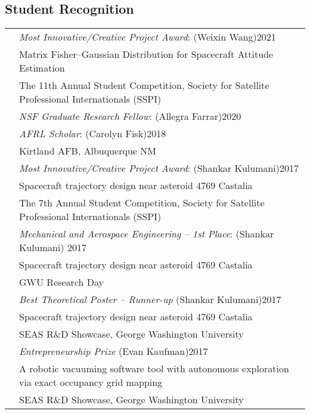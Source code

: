 \documentclass[10pt]{article}
\begin{document}
\subsection*{Student Recognition}
\setlength{\tabcolsep}{0cm}
\begin{tabularx}{\textwidth}{>{\setlength{\hsize}{0.5cm}}X X}%
& \textit{Most Innovative/Creative Project Award}: (Weixin Wang)\hfill 2021\\
& {Matrix Fisher--Gaussian Distribution for Spacecraft Attitude Estimation}\\
& The 11th Annual Student Competition, Society for Satellite Professional Internationals (SSPI)\\[0.2cm]

& \textit{NSF Graduate Research Fellow}: (Allegra Farrar)\hfill 2020\\[0.2cm]

& \textit{AFRL Scholar}: (Carolyn Fisk)\hfill 2018\\
& Kirtland AFB, Albuquerque NM\\[0.2cm]

& \textit{Most Innovative/Creative Project Award}: (Shankar Kulumani)\hfill 2017\\
& {Spacecraft trajectory design near asteroid 4769 Castalia}\\
& The 7th Annual Student Competition, Society for Satellite Professional Internationals (SSPI)\\[0.2cm]

& \textit{Mechanical and Aerospace Engineering -- 1st Place}: (Shankar Kulumani) \hfill 2017\\
& {Spacecraft trajectory design near asteroid 4769 Castalia}\\
& GWU Research Day\\[0.2cm]


& \textit{Best Theoretical Poster -- Runner-up} (Shankar Kulumani)\hfill 2017\\
& Spacecraft trajectory design near asteroid 4769 Castalia\\
& SEAS R\&D Showcase, George Washington University\\[0.2cm]


& \textit{Entrepreneurship Prize} (Evan Kaufman)\hfill 2017\\
& A robotic vacuuming software tool with autonomous exploration via exact occupancy grid mapping\\
& SEAS R\&D Showcase, George Washington University\\[0.2cm]



\end{tabularx}
\end{document}
